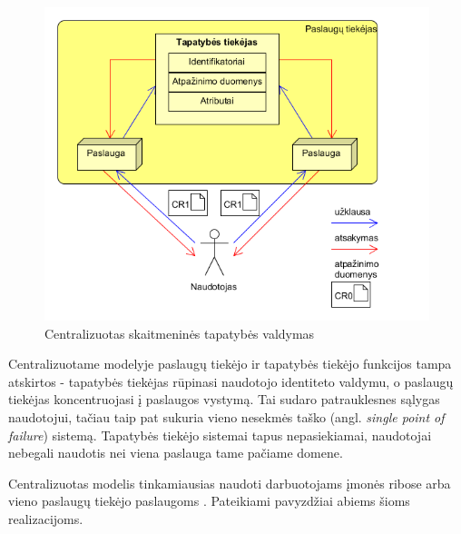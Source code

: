 \begin{figure}[H]
    \centering
    \includegraphics[scale=0.8]{img/centralizedModel}
    \caption{Centralizuotas skaitmeninės tapatybės valdymas \cite{Cao2010}}
    \label{fig:centralisedModel}
\end{figure}

Centralizuotame modelyje paslaugų tiekėjo ir tapatybės tiekėjo funkcijos tampa atskirtos - 
tapatybės tiekėjas rūpinasi naudotojo identiteto valdymu, o paslaugų tiekėjas koncentruojasi į paslaugos vystymą. Tai sudaro patrauklesnes sąlygas
naudotojui, tačiau taip pat sukuria vieno nesekmės taško (angl. \textit{single point of failure}) sistemą. Tapatybės tiekėjo sistemai tapus nepasiekiamai,
naudotojai nebegali naudotis nei viena paslauga tame pačiame domene.


Centralizuotas modelis tinkamiausias naudoti darbuotojams įmonės ribose arba vieno paslaugų tiekėjo paslaugoms \cite{Josang2005}.
Pateikiami pavyzdžiai abiems šioms realizacijoms. 

